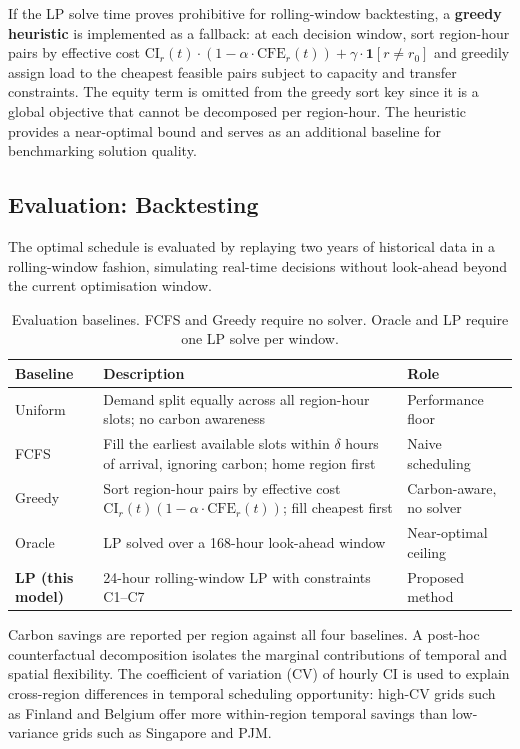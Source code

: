 \documentclass[11pt, a4paper]{article}
\begin{document}
If the LP solve time proves prohibitive for rolling-window backtesting, a \textbf{greedy heuristic} is implemented as a fallback: at each decision window, sort region-hour pairs by effective cost $\text{CI}_r(t)\cdot(1-\alpha\cdot\text{CFE}_r(t)) + \gamma\cdot\mathbf{1}[r \neq r_0]$ and greedily assign load to the cheapest feasible pairs subject to capacity and transfer constraints. The equity term is omitted from the greedy sort key since it is a global objective that cannot be decomposed per region-hour. The heuristic provides a near-optimal bound and serves as an additional baseline for benchmarking solution quality.

\subsection{Evaluation: Backtesting}

The optimal schedule is evaluated by replaying two years of historical data in a rolling-window fashion, simulating real-time decisions without look-ahead beyond the current optimisation window.

\begin{table}[h]
\centering\small
\renewcommand{\arraystretch}{1.3}
\begin{tabularx}{\linewidth}{p{2.2cm}Xp{3.2cm}}
\toprule
\textbf{Baseline} & \textbf{Description} & \textbf{Role} \\
\midrule
Uniform    & Demand split equally across all region-hour slots; no carbon awareness & Performance floor \\
FCFS       & Fill the earliest available slots within $\delta$ hours of arrival, ignoring carbon; home region first & Naive scheduling \\
Greedy     & Sort region-hour pairs by effective cost $\text{CI}_r(t)(1{-}\alpha\cdot\text{CFE}_r(t))$; fill cheapest first & Carbon-aware, no solver \\
Oracle     & LP solved over a 168-hour look-ahead window & Near-optimal ceiling \\
\textbf{LP (this model)} & 24-hour rolling-window LP with constraints C1--C7 & Proposed method \\
\bottomrule
\end{tabularx}
\caption{Evaluation baselines. FCFS and Greedy require no solver. Oracle and LP require one LP solve per window.}
\end{table}

Carbon savings are reported per region against all four baselines. A post-hoc counterfactual decomposition isolates the marginal contributions of temporal and spatial flexibility. The coefficient of variation (CV) of hourly CI is used to explain cross-region differences in temporal scheduling opportunity: high-CV grids such as Finland and Belgium offer more within-region temporal savings than low-variance grids such as Singapore and PJM.
\end{document}
